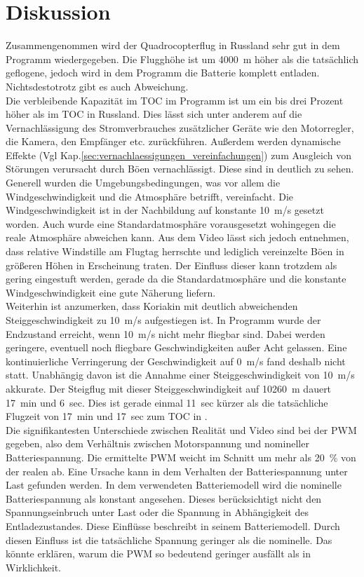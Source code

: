 \section{Diskussion}
\label{sec:nachbildung_diskussion}
Zusammengenommen wird der Quadrocopterflug in Russland sehr gut in dem Programm wiedergegeben. Die Flugghöhe ist um \SI{4000}{m} höher als die tatsächlich geflogene, jedoch wird in dem Programm die Batterie komplett entladen. Nichtsdestotrotz gibt es auch Abweichung.\\
Die verbleibende Kapazität im TOC im Programm ist um ein bis drei Prozent höher als im TOC in Russland. Dies lässt sich unter anderem auf die Vernachlässigung des Stromverbrauches zusätzlicher Geräte wie den Motorregler, die Kamera, den Empfänger etc. zurückführen. Außerdem werden dynamische Effekte (Vgl Kap.\ref{sec:vernachlaessigungen_vereinfachungen}) zum Ausgleich von Störungen verursacht durch Böen vernachlässigt. Diese sind in \cite{Anderson.2018} deutlich zu sehen. Generell wurden die Umgebungsbedingungen, was vor allem die Windgeschwindigkeit und die Atmosphäre betrifft, vereinfacht. Die Windgeschwindigkeit ist in der Nachbildung auf konstante \SI{10}{m/s} gesetzt worden. Auch wurde eine Standardatmosphäre vorausgesetzt wohingegen die reale Atmosphäre abweichen kann. Aus dem Video lässt sich jedoch entnehmen, dass relative Windstille am Flugtag herrschte und lediglich vereinzelte Böen in größeren Höhen in Erscheinung traten. Der Einfluss dieser kann trotzdem als gering eingestuft werden, gerade da die Standardatmosphäre und die konstante Windgeschwindigkeit eine gute Näherung liefern. \\
Weiterhin ist anzumerken, dass Koriakin mit deutlich abweichenden Steiggeschwindigkeit zu \SI{10}{m/s} aufgestiegen ist. In Programm wurde der Endzustand erreicht, wenn \SI{10}{m/s} nicht mehr fliegbar sind. Dabei werden geringere, eventuell noch fliegbare Geschwindigkeiten außer Acht gelassen. Eine kontinuierliche Verringerung der Geschwindigkeit auf \SI{0}{m/s} fand deshalb nicht statt. Unabhängig davon ist die Annahme einer Steiggeschwindigkeit von \SI{10}{m/s} akkurate. Der Steigflug mit dieser Steiggeschwindigkeit auf \SI{10260}{m} dauert \SI{17}{min} und \SI{6}{sec}. Dies ist gerade einmal \SI{11}{sec} kürzer als die tatsächliche Flugzeit von \SI{17}{min} und \SI{17}{sec} zum TOC in \cite{Anderson.2018}.\\
Die signifikantesten Unterschiede zwischen Realität und Video sind bei der PWM gegeben, also dem Verhältnis zwischen Motorspannung und nomineller Batteriespannung. Die ermittelte PWM weicht im Schnitt um mehr als \SI{20}{\%} von der realen ab. Eine Ursache kann in dem Verhalten der Batteriespannung unter Last gefunden werden. In dem verwendeten Batteriemodell wird die nominelle Batteriespannung als konstant angesehen. Dieses berücksichtigt nicht den Spannungseinbruch unter Last oder die Spannung in Abhängigkeit des Entladezustandes. Diese Einflüsse beschreibt \cite{Tremblay.2009} in seinem Batteriemodell. Durch diesen Einfluss ist die tatsächliche Spannung geringer als die nominelle. Das könnte erklären, warum die PWM so bedeutend geringer ausfällt als in Wirklichkeit. \\
